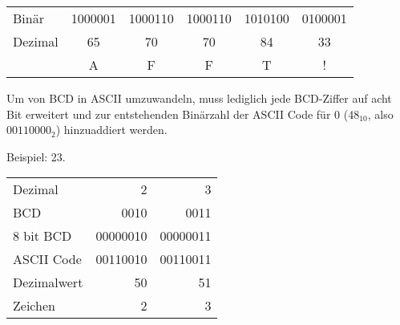\documentclass{CInf_practice}
\begin{document}
\begin{center}
  \begin{tabular}{B|CCCCC}
    Binär   & 1000001 & 1000110 & 1000110 & 1010100 & 0100001 \\
    Dezimal &      65 &      70 &      70 &      84 &      33 \\ \hline
            &       A &       F &       F &       T &       !
  \end{tabular}
\end{center}



Um von BCD in ASCII umzuwandeln, muss lediglich jede BCD-Ziffer auf acht Bit
erweitert und zur entstehenden Binärzahl der ASCII Code für 0 ($48_{10}$, also
$00110000_2$) hinzuaddiert werden.

Beispiel: 23.

\begin{center}
  \begin{tabular}{B|RR}
    Dezimal & 2 & 3 \\
    BCD     & 0010 & 0011 \\
    8 bit BCD & 00000010 & 00000011 \\
    ASCII Code & 00110010 & 00110011 \\
    Dezimalwert & 50 & 51 \\
    Zeichen & 2 & 3
  \end{tabular}
\end{center}
\end{document}
